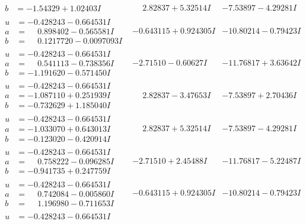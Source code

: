 \documentclass[1p]{elsarticle_modified}
\theoremstyle{definition}
\begin{document}
$$\begin{array}{c|c|c}
\begin{aligned}
b &= -1.54329 + 1.02403 I\end{aligned}
 & \phantom{-}2.82837 + 5.32514 I & -7.53897 - 4.29281 I \\ \hline\begin{aligned}
u &= -0.428243 - 0.664531 I \\
a &= \phantom{-}0.898402 - 0.565581 I \\
b &= \phantom{-}0.1217720 - 0.0097093 I\end{aligned}
 & -0.643115 + 0.924305 I & -10.80214 - 0.79423 I \\ \hline\begin{aligned}
u &= -0.428243 - 0.664531 I \\
a &= \phantom{-}0.541113 - 0.738356 I \\
b &= -1.191620 - 0.571450 I\end{aligned}
 & -2.71510 - 0.60627 I & -11.76817 + 3.63642 I \\ \hline\begin{aligned}
u &= -0.428243 - 0.664531 I \\
a &= -1.087110 + 0.251939 I \\
b &= -0.732629 + 1.185040 I\end{aligned}
 & \phantom{-}2.82837 - 3.47653 I & -7.53897 + 2.70436 I \\ \hline\begin{aligned}
u &= -0.428243 - 0.664531 I \\
a &= -1.033070 + 0.643013 I \\
b &= -0.123020 - 0.420914 I\end{aligned}
 & \phantom{-}2.82837 + 5.32514 I & -7.53897 - 4.29281 I \\ \hline\begin{aligned}
u &= -0.428243 - 0.664531 I \\
a &= \phantom{-}0.758222 - 0.096285 I \\
b &= -0.941735 + 0.247759 I\end{aligned}
 & -2.71510 + 2.45488 I & -11.76817 - 5.22487 I \\ \hline\begin{aligned}
u &= -0.428243 - 0.664531 I \\
a &= \phantom{-}0.742084 - 0.005860 I \\
b &= \phantom{-}1.196980 - 0.711653 I\end{aligned}
 & -0.643115 + 0.924305 I & -10.80214 - 0.79423 I \\ \hline\begin{aligned}
u &= -0.428243 - 0.664531 I \\

\end{aligned}
\end{array}$$
\end{document}
